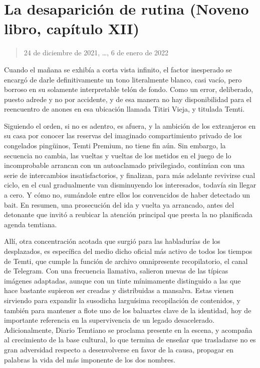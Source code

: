 \documentclass[
]{book}
\begin{document}
\hypertarget{la-desapariciuxf3n-de-rutina-noveno-libro-capuxedtulo-xii}{%
\section{La desaparición de rutina (Noveno libro, capítulo XII)}\label{la-desapariciuxf3n-de-rutina-noveno-libro-capuxedtulo-xii}}

\begin{quote}
24 de diciembre de 2021, \ldots, 6 de enero de 2022
\end{quote}

Cuando el mañana se exhibía a corta vista infinito, el factor inesperado se encargó de darle definitivamente un tono literalmente blanco, casi vacío, pero borroso en su solamente interpretable telón de fondo. Como un error, deliberado, puesto adrede y no por accidente, y de esa manera no hay disponibilidad para el reencuentro de anones en esa ubicación llamada Titiri Vieja, y titulada Temti.

Siguiendo el orden, si no es adentro, es afuera, y la ambición de los extranjeros en su casa por conocer las reservas del imaginado compartimiento privado de los congelados pingüinos, Temti Premium, no tiene fin aún. Sin embargo, la secuencia no cambia, las vueltas y vueltas de los metidos en el juego de lo incomprobable arrancan con un autoaclamado privilegiado, continúan con una serie de intercambios insatisfactorios, y finalizan, para más adelante revivirse cual ciclo, en el cual gradualmente van disminuyendo los interesados, todavía sin llegar a cero. Y cómo no, sumándole entre ellos los convencidos de haber detectado un bait. En resumen, una prosecución del ida y vuelta ya arrancado, antes del detonante que invitó a reubicar la atención principal que presta la no planificada agenda temtiana.

Allí, otra concentración acotada que surgió para las habladurías de los desplazados, es específica del medio dicho oficial más activo de todos los tiempos de Temti, que cumple la función de archivo omnipresente recopilatorio, el canal de Telegram. Con una frecuencia llamativa, salieron nuevas de las típicas imágenes adaptadas, aunque con un tinte mínimamente distinguido a las que hace bastante supieron ser creadas y distribuidas a mansalva. Estas vienen sirviendo para expandir la susodicha larguísima recopilación de contenidos, y también para mantener a flote uno de los baluartes clave de la identidad, hoy de importante referencia en la supervivencia de un legado desacelerado. Adicionalmente, Diario Temtiano se proclama presente en la escena, y acompaña al crecimiento de la base cultural, lo que termina de enseñar que trasladarse no es gran adversidad respecto a desenvolverse en favor de la causa, propagar en palabras la vida del más imponente de los dos nombres.
\end{document}

